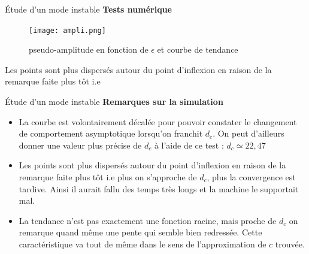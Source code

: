 \documentclass{beamer}
\begin{document}

\begin{frame}{\'Etude d'un mode instable}
\textbf{Tests numérique}\\
\begin{figure}
\texttt{[image: ampli.png]}
\caption{\label{fig:graph4} pseudo-amplitude en fonction de $\epsilon$ et courbe de tendance}
\end{figure}
Les points sont plus dispersés autour du point d'inflexion en raison de la remarque faite plus tôt i.e 
\end{frame}

\begin{frame}{\'Etude d'un mode instable}
\textbf{Remarques sur la simulation}\\
\begin{itemize}
    \item La courbe est volontairement décalée pour pouvoir constater le changement de comportement asymptotique lorsqu'on franchit $d_c$. On peut d'ailleurs donner une valeur plus précise de $d_c$ à l'aide de ce test : $d_c\simeq 22,47$
    \item Les points sont plus dispersés autour du point d'inflexion en raison de la remarque faite plus tôt i.e plus on s'approche de $d_c$, plus la convergence est tardive. Ainsi il aurait fallu des temps très longs et la machine le supportait mal.
    \item La tendance n'est pas exactement une fonction racine, mais proche de $d_c$ on remarque quand même une pente qui semble bien redressée. Cette caractéristique va tout de même dans le sens de l'approximation de $c$ trouvée.
\end{itemize}
\end{frame}

\end{document}
